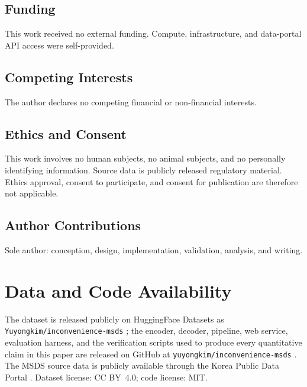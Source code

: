 \documentclass[journal]{IEEEtran}
\begin{document}
\subsection*{Funding}
This work received no external funding. Compute, infrastructure, and data-portal API access were self-provided.

\subsection*{Competing Interests}
The author declares no competing financial or non-financial interests.

\subsection*{Ethics and Consent}
This work involves no human subjects, no animal subjects, and no personally identifying information. Source data is publicly released regulatory material. Ethics approval, consent to participate, and consent for publication are therefore not applicable.

\subsection*{Author Contributions}
Sole author: conception, design, implementation, validation, analysis, and writing.

\section*{Data and Code Availability}

The dataset is released publicly on HuggingFace Datasets as \texttt{Yuyongkim/inconvenience-msds} \cite{hf_dataset}; the encoder, decoder, pipeline, web service, evaluation harness, and the verification scripts used to produce every quantitative claim in this paper are released on GitHub at \texttt{yuyongkim/inconvenience-msds} \cite{github_repo}. The MSDS source data is publicly available through the Korea Public Data Portal \cite{data_go_kr}. Dataset license: CC BY~4.0; code license: MIT.
\end{document}
